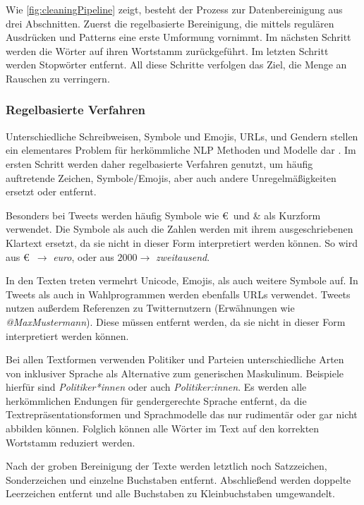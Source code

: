 Wie \autoref{fig:cleaningPipeline} zeigt, besteht der Prozess zur Datenbereinigung aus drei Abschnitten. Zuerst die regelbasierte Bereinigung, die mittels regulären Ausdrücken und Patterns eine erste Umformung vornimmt. Im nächsten Schritt werden die Wörter auf ihren Wortstamm zurückgeführt. Im letzten Schritt werden Stopwörter entfernt. All diese Schritte verfolgen das Ziel, die Menge an Rauschen zu verringern. 

\subsubsection{Regelbasierte Verfahren}

Unterschiedliche Schreibweisen, Symbole und Emojis, \acp{URL}, und Gendern stellen ein elementares Problem für herkömmliche \ac{NLP} Methoden und Modelle dar \autocite[4\psq]{kowsari_text_2019}. Im ersten Schritt werden daher regelbasierte Verfahren genutzt, um häufig auftretende Zeichen, Symbole/Emojis, aber auch andere Unregelmäßigkeiten ersetzt oder entfernt.

Besonders bei Tweets werden häufig Symbole wie \euro~und \& als Kurzform verwendet. Die Symbole als auch die Zahlen werden mit ihrem ausgeschriebenen Klartext ersetzt, da sie nicht in dieser Form interpretiert werden können. So wird aus \euro~\(\rightarrow\) \textit{euro}, oder aus \(\num{2000} \rightarrow\) \textit{zweitausend}.

In den Texten treten vermehrt Unicode, Emojis, als auch weitere Symbole auf. In Tweets als auch in Wahlprogrammen werden ebenfalls \acp{URL} verwendet. Tweets nutzen außerdem Referenzen zu Twitternutzern (Erwähnungen wie \textit{@MaxMustermann}). Diese müssen entfernt werden, da sie nicht in dieser Form interpretiert werden können.

Bei allen Textformen verwenden Politiker und Parteien unterschiedliche Arten von inklusiver Sprache als Alternative zum generischen Maskulinum. Beispiele hierfür sind \textit{Politiker*innen} oder auch \textit{Politiker:innen}. Es  werden alle herkömmlichen Endungen für gendergerechte Sprache entfernt, da die Textrepräsentationsformen und Sprachmodelle das nur rudimentär oder gar nicht abbilden können. Folglich können alle Wörter im Text auf den korrekten Wortstamm reduziert werden.

Nach der groben Bereinigung der Texte werden letztlich noch Satzzeichen, Sonderzeichen und einzelne Buchstaben entfernt. Abschließend werden doppelte Leerzeichen entfernt und alle Buchstaben zu Kleinbuchstaben umgewandelt.

